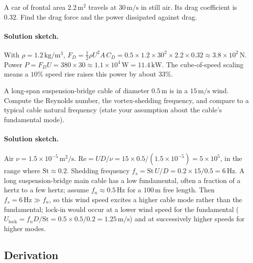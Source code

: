 \begin{exercise}
A car of frontal area $2.2\,\si{\meter}^2$ travels at $30\,\si{
\meter\per\second}$ in still air. Its drag coefficient is $0.32$.
Find the drag force and the power dissipated against drag.

\paragraph{Solution sketch.} With $\rho = 1.2\,\si{\kilogram\per
\meter\cubed}$, $F_D = \tfrac12\rho U^2 A\,C_D = 0.5\times1.2\times
30^2\times2.2\times0.32 \approx 3.8\times10^{2}\,\si{\newton}$. Power
$P = F_D U = 380\times30 \approx 1.1\times10^{4}\,\si{\watt} =
11.4\,\text{kW}$. The cube-of-speed scaling means a $10\%$ speed
rise raises this power by about $33\%$.
\end{exercise}

\begin{exercise}
A long-span suspension-bridge cable of diameter $0.5\,\si{\meter}$
is in a $15\,\si{\meter\per\second}$ wind. Compute the Reynolds
number, the vortex-shedding frequency, and compare to a typical
cable natural frequency (state your assumption about the cable's
fundamental mode).

\paragraph{Solution sketch.} Air $\nu = 1.5\times10^{-5}\,\si{\meter
}^2/\si{\second}$. $\text{Re} = UD/\nu = 15\times0.5/(1.5\times
10^{-5}) = 5\times10^{5}$, in the range where $\text{St}\approx0.2$.
Shedding frequency $f_s = \text{St}\,U/D = 0.2\times15/0.5 = 6\,\si{
\hertz}$. A long suspension-bridge main cable has a low fundamental,
often a fraction of a hertz to a few hertz; assume $f_n\approx
0.5\,\si{\hertz}$ for a $100\,\si{\meter}$ free length. Then $f_s =
6\,\si{\hertz}\gg f_n$, so this wind speed excites a higher cable
mode rather than the fundamental; lock-in would occur at a lower
wind speed for the fundamental ($U_{\text{lock}} = f_n D/\text{St} =
0.5\times0.5/0.2 = 1.25\,\si{\meter\per\second}$) and at successively
higher speeds for higher modes.
\end{exercise}

\subsection*{Derivation}

